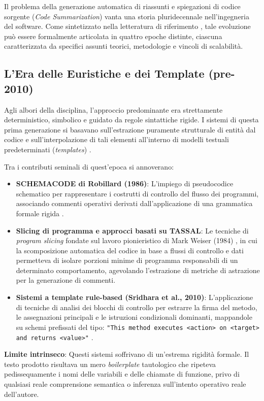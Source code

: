 Il problema della generazione automatica di riassunti e spiegazioni di codice sorgente (\emph{Code Summarization}) vanta una storia pluridecennale nell'ingegneria del software. Come sintetizzato nella letteratura di riferimento \cite{zhang_survey_2022,rai_review_2022,zhu_deep_2024}, tale evoluzione può essere formalmente articolata in quattro epoche distinte, ciascuna caratterizzata da specifici assunti teorici, metodologie e vincoli di scalabilità.

\subsection{L'Era delle Euristiche e dei Template (pre-2010)}
\label{subsec:era_euristiche}
Agli albori della disciplina, l'approccio predominante era strettamente deterministico, simbolico e guidato da regole sintattiche rigide. I sistemi di questa prima generazione si basavano sull'estrazione puramente strutturale di entità dal codice e sull'interpolazione di tali elementi all'interno di modelli testuali predeterminati (\emph{templates}) \cite{sridhara_towards_2010}.

Tra i contributi seminali di quest'epoca si annoverano:
\begin{itemize}[leftmargin=*, label=\textbullet]
    \item \textbf{SCHEMACODE di Robillard (1986)}: L'impiego di pseudocodice schematico per rappresentare i costrutti di controllo del flusso dei programmi, associando commenti operativi derivati dall'applicazione di una grammatica formale rigida \cite{robillard_schematic_1986}.
    \item \textbf{Slicing di programma e approcci basati su TASSAL}: Le tecniche di \emph{program slicing} fondate sul lavoro pionieristico di Mark Weiser (1984) \cite{weiser_program_1984}, in cui la scomposizione automatica del codice in base a flussi di controllo e dati permetteva di isolare porzioni minime di programma responsabili di un determinato comportamento, agevolando l'estrazione di metriche di astrazione per la generazione di commenti.
    \item \textbf{Sistemi a template rule-based (Sridhara et al., 2010)}: L'applicazione di tecniche di analisi dei blocchi di controllo per estrarre la firma del metodo, le assegnazioni principali e le istruzioni condizionali dominanti, mappandole su schemi prefissati del tipo: \texttt{"This method executes <action> on <target> and returns <value>"} \cite{sridhara_towards_2010}.
\end{itemize}
\textbf{Limite intrinseco}: Questi sistemi soffrivano di un'estrema rigidità formale. Il testo prodotto risultava un mero \emph{boilerplate} tautologico che ripeteva pedissequamente i nomi delle variabili e delle chiamate di funzione, privo di qualsiasi reale comprensione semantica o inferenza sull'intento operativo reale dell'autore.

